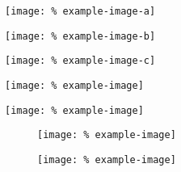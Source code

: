 \documentclass{article}
\let\vamaxheight\relax
\newlength{%
		\vamaxheight}%
\begin{document}
\begin{verticallyaligned}
	\noindent
	\begin{minipage}[b][\vamaxheight][b]{%
			.30\textwidth}
		\centering
		\texttt{[image: \%
			example-image-a]}%
	\end{minipage}
	\hfill
	\begin{minipage}[b][\vamaxheight][t]{%
			.10\textwidth}
		\centering
		\texttt{[image: \%
			example-image-b]}%
	\end{minipage}
	\hfill
	\begin{minipage}[b][\vamaxheight][t]{%
			.20\textwidth}
		\centering
		\texttt{[image: \%
			example-image-c]}%
	\end{minipage}
	\hfill
	\begin{minipage}[b][\vamaxheight][c]{%
			.20\textwidth}
		\centering
		\texttt{[image: \%
			example-image]}%
	\end{minipage}
	\hfill
	\begin{minipage}[b][\vamaxheight][t]{%
			.20\textwidth}
		\centering
		\texttt{[image: \%
			example-image]}%
	\end{minipage}
\end{verticallyaligned}

\lipsum[1]

\begin{figure}
	\begin{verticallyaligned}
		\noindent
		\begin{minipage}[b][\vamaxheight][c]{%
				.50\textwidth}
			\centering
			\texttt{[image: \%
				example-image]}%
			\caption{%
			}%
		\end{minipage}
		\hfill
		\begin{minipage}[b][\vamaxheight][t]{%
				.40\textwidth}
			\centering
			\texttt{[image: \%
				example-image]}%
			\caption{%
			}%
		\end{minipage}
	\end{verticallyaligned}
	\caption{%
	}%
\end{figure}
\end{document}
